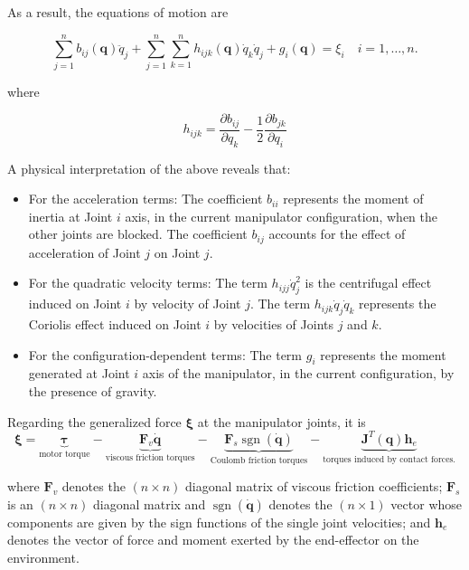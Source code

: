\documentclass[10pt]{article}
\begin{document}
As a result, the equations of motion are

$$
\sum_{j=1}^{n} b_{i j}(\boldsymbol{q}) \ddot{q}_{j}+\sum_{j=1}^{n} \sum_{k=1}^{n} h_{i j k}(\boldsymbol{q}) \dot{q}_{k} \dot{q}_{j}+g_{i}(\boldsymbol{q})=\xi_{i} \quad i=1, \ldots, n .
$$

where

$$
h_{i j k}=\frac{\partial b_{i j}}{\partial q_{k}}-\frac{1}{2} \frac{\partial b_{j k}}{\partial q_{i}}
$$

A physical interpretation of the above reveals that:

\begin{itemize}
  \item For the acceleration terms: 
  The coefficient $b_{i i}$ represents the moment of inertia at Joint $i$ axis, in the current manipulator configuration, when the other joints are blocked. The coefficient $b_{i j}$ accounts for the effect of acceleration of Joint $j$ on Joint $j$.

  \item For the quadratic velocity terms: The term $h_{i j j} \dot{q}_{j}^{2}$ is the centrifugal effect induced on Joint $i$ by velocity of Joint $j$. The term $h_{i j k} \dot{q}_{j} \dot{q}_{k}$ represents the Coriolis effect induced on Joint $i$ by velocities of Joints $j$ and $k$.

\item For the configuration-dependent terms:
The term $g_{i}$ represents the moment generated at Joint $i$ axis of the manipulator, in the current configuration, by the presence of gravity.

\end{itemize}








Regarding the generalized force $\boldsymbol{\xi}$ at the manipulator joints, it is
\begin{equation}
    \boldsymbol{\xi}=\underbrace{\boldsymbol{\tau}}_{\text{motor torque}}-\underbrace{\boldsymbol{F}_{v} \dot{\boldsymbol{q}}}_{\text{viscous friction torques}}-\underbrace{\boldsymbol{F}_{s} \operatorname{sgn}(\dot{\boldsymbol{q}})}_{\text{Coulomb friction torques}}-\underbrace{\boldsymbol{J}^{T}(\boldsymbol{q}) \boldsymbol{h}_{e}}_{\text{torques induced by  contact forces.}}
\end{equation}

where $\boldsymbol{F}_{v}$ denotes the $(n \times n)$ diagonal matrix of viscous friction coefficients; $\boldsymbol{F}_{s}$ is an $(n \times n)$ diagonal matrix and $\operatorname{sgn}(\dot{\boldsymbol{q}})$ denotes the $(n \times 1)$ vector whose components are given by the sign functions of the single joint velocities; and $\boldsymbol{h}_{e}$ denotes the vector of force and moment exerted by the end-effector on the environment.
\end{document}
